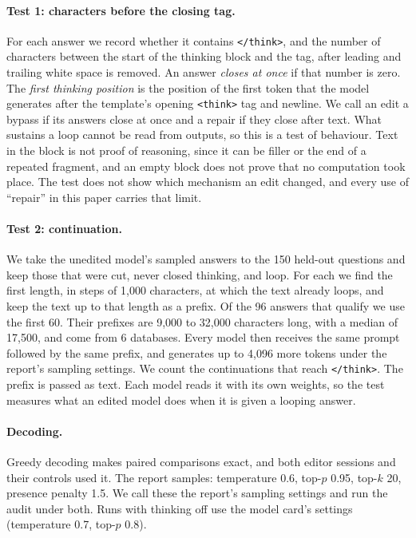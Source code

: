 \documentclass[11pt]{article}
\newcommand{\think}{\texttt{</think>}}
\begin{document}
\paragraph{Test 1: characters before the closing tag.} For each answer we record whether it contains \think{}, and the number of characters between the start of the thinking block and the tag, after leading and trailing white space is removed. An answer \emph{closes at once} if that number is zero. The \emph{first thinking position} is the position of the first token that the model generates after the template's opening \texttt{<think>} tag and newline. We call an edit a bypass if its answers close at once and a repair if they close after text. What sustains a loop cannot be read from outputs, so this is a test of behaviour. Text in the block is not proof of reasoning, since it can be filler or the end of a repeated fragment, and an empty block does not prove that no computation took place. The test does not show which mechanism an edit changed, and every use of ``repair'' in this paper carries that limit.

\paragraph{Test 2: continuation.} We take the unedited model's sampled answers to the 150 held-out questions and keep those that were cut, never closed thinking, and loop. For each we find the first length, in steps of 1,000 characters, at which the text already loops, and keep the text up to that length as a prefix. Of the 96 answers that qualify we use the first 60. Their prefixes are 9,000 to 32,000 characters long, with a median of 17,500, and come from 6 databases. Every model then receives the same prompt followed by the same prefix, and generates up to 4,096 more tokens under the report's sampling settings. We count the continuations that reach \think{}. The prefix is passed as text. Each model reads it with its own weights, so the test measures what an edited model does when it is given a looping answer.

\paragraph{Decoding.} Greedy decoding makes paired comparisons exact, and both editor sessions and their controls used it. The report samples: temperature 0.6, top-$p$ 0.95, top-$k$ 20, presence penalty 1.5. We call these the report's sampling settings and run the audit under both. Runs with thinking off use the model card's settings (temperature 0.7, top-$p$ 0.8).
\end{document}
